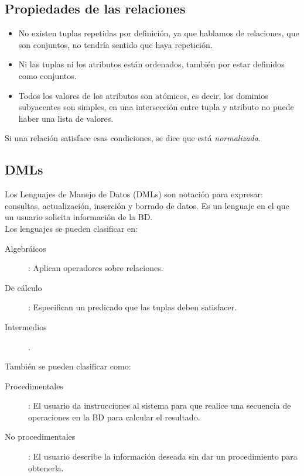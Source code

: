 \documentclass[a4paper]{article}
\begin{document}
\subsection{Propiedades de las relaciones}
\begin{itemize}
    \item No existen tuplas repetidas por definici\'on, ya que hablamos de relaciones, que
    son conjuntos, no tendr\'ia sentido que haya repetici\'on.
    \item Ni las tuplas ni los atributos est\'an ordenados, tambi\'en por estar definidos
    como conjuntos.
    \item Todos los valores de los atributos son at\'omicos, es decir, los dominios
    subyacentes son simples, en una intersecci\'on entre tupla y atributo no puede haber
    una lista de valores.
\end{itemize}
Si una relaci\'on satisface esas condiciones, se dice que est\'a \textit{normalizada}.

\subsection{DMLs}
Los Lenguajes de Manejo de Datos (DMLs) son notaci\'on para expresar: consultas,
actualizaci\'on, inserci\'on y borrado de datos. Es un lenguaje en el que un usuario
solicita informaci\'on de la BD. \\
Los lenguajes se pueden clasificar en:
\begin{description}
    \item[Algebr\'aicos]: Aplican operadores sobre relaciones.
    \item[De c\'alculo]: Especifican un predicado que las tuplas deben satisfacer.
    \item[Intermedios].
\end{description}
Tambi\'en se pueden clasificar como:
\begin{description}
    \item[Procedimentales]: El usuario da instrucciones al sistema para que realice
    una secuencia de operaciones en la BD para calcular el resultado.
    \item[No procedimentales]: El usuario describe la informaci\'on deseada sin dar un
    procedimiento para obtenerla.
\end{description}
\end{document}
